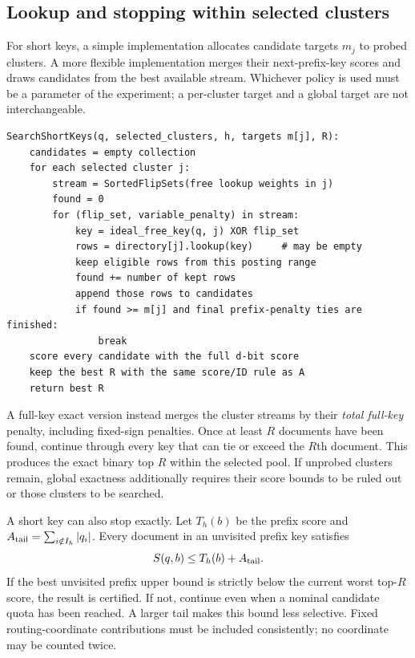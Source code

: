 \subsection{Lookup and stopping within selected clusters}
For short keys, a simple implementation allocates candidate targets $m_j$ to probed clusters.
A more flexible implementation merges their next-prefix-key scores and draws candidates from
the best available stream. Whichever policy is used must be a parameter of the experiment;
a per-cluster target and a global target are not interchangeable.

\par\noindent\begin{minipage}{\linewidth}
\begin{lstlisting}[caption={Short-key candidate search with explicit per-cluster targets.}]
SearchShortKeys(q, selected_clusters, h, targets m[j], R):
    candidates = empty collection
    for each selected cluster j:
        stream = SortedFlipSets(free lookup weights in j)
        found = 0
        for (flip_set, variable_penalty) in stream:
            key = ideal_free_key(q, j) XOR flip_set
            rows = directory[j].lookup(key)     # may be empty
            keep eligible rows from this posting range
            found += number of kept rows
            append those rows to candidates
            if found >= m[j] and final prefix-penalty ties are finished:
                break
    score every candidate with the full d-bit score
    keep the best R with the same score/ID rule as A
    return best R
\end{lstlisting}
\end{minipage}\par

A full-key exact version instead merges the cluster streams by their \emph{total full-key}
penalty, including fixed-sign penalties. Once at least $R$ documents have been found, continue
through every key that can tie or exceed the $R$th document. This produces the exact binary
top $R$ within the selected pool. If unprobed clusters remain, global exactness additionally
requires their score bounds to be ruled out or those clusters to be searched.

A short key can also stop exactly. Let $T_h(b)$ be the prefix score and
$A_{\rm tail}=\sum_{i\notin I_h}|q_i|$. Every document in an unvisited prefix key satisfies
\begin{equation}
S(q,b)\leq T_h(b)+A_{\rm tail}.
\label{eq:prefix-bound}
\end{equation}
If the best unvisited prefix upper bound is strictly below the current worst top-$R$ score,
the result is certified. If not, continue even when a nominal candidate quota has been reached.
A larger tail makes this bound less selective. Fixed routing-coordinate contributions must be
included consistently; no coordinate may be counted twice.

